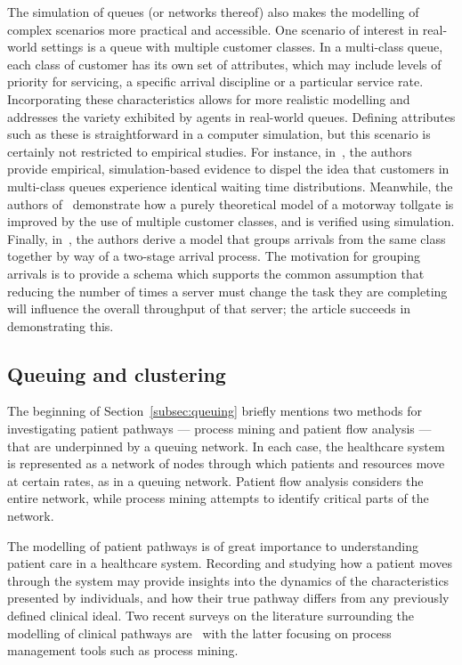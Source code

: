 The simulation of queues (or networks thereof) also makes the modelling of
complex scenarios more practical and accessible. One scenario of interest in
real-world settings is a queue with multiple customer classes. In a multi-class
queue, each class of customer has its own set of attributes, which may include
levels of priority for servicing, a specific arrival discipline or a particular
service rate. Incorporating these characteristics allows for more realistic
modelling and addresses the variety exhibited by agents in real-world queues.
Defining attributes such as these is straightforward in a computer simulation,
but this scenario is certainly not restricted to empirical studies. For
instance, in~\cite{RomeroSilva2017}, the authors provide empirical,
simulation-based evidence to dispel the idea that customers in multi-class
queues experience identical waiting time distributions. Meanwhile, the authors
of~\cite{Pompigna2020} demonstrate how a purely theoretical model of a motorway
tollgate is improved by the use of multiple customer classes, and is verified
using simulation. Finally, in~\cite{Reveil2014}, the authors derive a model that
groups arrivals from the same class together by way of a two-stage arrival
process. The motivation for grouping arrivals is to provide a schema which
supports the common assumption that reducing the number of times a server must
change the task they are completing will influence the overall throughput of
that server; the article succeeds in demonstrating this.

\subsection{Queuing and clustering}

The beginning of Section~\ref{subsec:queuing} briefly mentions two methods
for investigating patient pathways --- process mining and patient flow analysis
--- that are underpinned by a queuing network. In each case, the healthcare
system is represented as a network of nodes through which patients and resources
move at certain rates, as in a queuing network. Patient flow analysis considers
the entire network, while process mining attempts to identify critical parts of
the network.

The modelling of patient pathways is of great importance to understanding
patient care in a healthcare system. Recording and studying how a patient moves
through the system may provide insights into the dynamics of the characteristics
presented by individuals, and how their true pathway differs from any previously
defined clinical ideal. Two recent surveys on the literature surrounding the
modelling of clinical pathways are~\cite{Aspland2019,DeRamonFernandez2019} with
the latter focusing on process management tools such as process mining.

